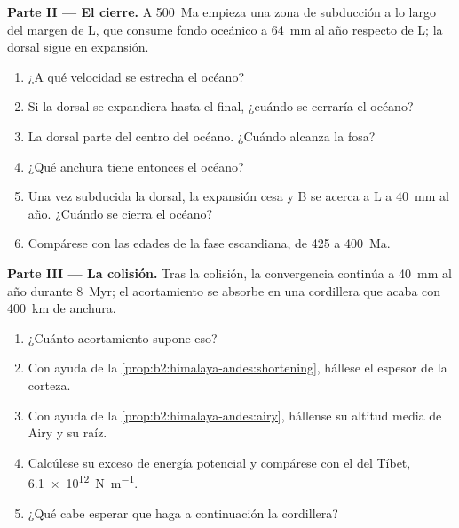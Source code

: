 \begin{problem}
\noindent\textbf{Parte II --- El cierre.} A \qty{500}{Ma} empieza una zona de subducción a lo largo del
margen de L, que consume fondo oceánico a \qty{64}{mm} al año respecto de L; la dorsal sigue
en expansión.
\begin{enumerate}[resume]
\item ¿A qué velocidad se estrecha el océano?
\item Si la dorsal se expandiera hasta el final, ¿cuándo se cerraría el océano?
\item La dorsal parte del centro del océano. ¿Cuándo alcanza la fosa?
\item ¿Qué anchura tiene entonces el océano?
\item Una vez subducida la dorsal, la expansión cesa y B se acerca a L a \qty{40}{mm} al
año. ¿Cuándo se cierra el océano?
\item Compárese con las edades de la fase escandiana, de 425 a \qty{400}{Ma}.
\end{enumerate}

\noindent\textbf{Parte III --- La colisión.} Tras la colisión, la convergencia continúa a
\qty{40}{mm} al año durante \qty{8}{Myr}; el acortamiento se absorbe en una cordillera que acaba con
\qty{400}{km} de anchura.
\begin{enumerate}[resume]
\item ¿Cuánto acortamiento supone eso?
\item Con ayuda de la \cref{prop:b2:himalaya-andes:shortening}, hállese el espesor de la corteza.
\item Con ayuda de la \cref{prop:b2:himalaya-andes:airy}, hállense su altitud media de Airy y su raíz.
\item Calcúlese su exceso de energía potencial y compárese con el del Tíbet,
\qty{6.1e12}{N.m^{-1}}.
\item ¿Qué cabe esperar que haga a continuación la cordillera?
\end{enumerate}


\end{problem}
